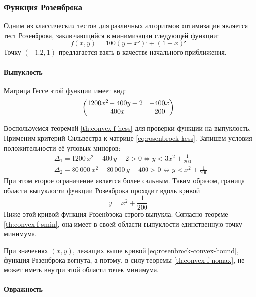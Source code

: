 \subsubsection{Функция Розенброка}

Одним из классических тестов для различных алгоритмов оптимизации
является тест Розенброка, заключающийся в минимизации следующей
функции:
\begin{equation}
  \label{eq:rosenbrock}
  f(x, y) = 100(y - x²)² + (1 - x)²
\end{equation}
Точку $(-1.2, 1)$ предлагается взять в качестве начального
приближения.

\paragraph{Выпуклость}

Матрица Гессе этой функции имеет вид:
\begin{equation}
  \label{eq:rosenbrock-hess}
  \begin{pmatrix}
    1200x^2-400y+2 & -400x \\
    -400x & \phm200\phantom{x}
  \end{pmatrix}
\end{equation}

Воспользуемся теоремой \ref{th:convex-f-hess} для проверки функции на
выпуклость. Применим критерий Сильвестра к матрице
\eqref{eq:rosenbrock-hess}. Запишем условия положительности её угловых
миноров:
\begin{align*}
  &\Delta_1 = 1200\,x^2-400\,y+2 > 0 \iff y < 3x^2+\frac{1}{200}\\
  &\Delta_2 = 80\,000\,x^2-80\,000\,y+400 > 0 \iff y < x^2+\frac{1}{200}
\end{align*}
При этом второе ограничение является более сильным. Таким образом,
граница области выпуклости функции Розенброка проходит вдоль кривой
\begin{equation}
  \label{eq:rosenbrock-convex-bound}
  y = x^2 +\frac{1}{200}
\end{equation}
Ниже этой кривой функция Розенброка строго выпукла. Согласно теореме
\ref{th:convex-f-smin}, она имеет в своей области выпуклости
единственную точку минимума.

При значениях $(x, y)$, лежащих выше кривой
\eqref{eq:rosenbrock-convex-bound}, функция Розенброка вогнута, а
потому, в силу теоремы \ref{th:convex-f-nomax}, не может иметь внутри
этой области точек минимума.

\paragraph{Овражность}

